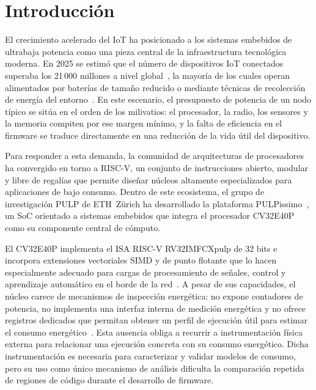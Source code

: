 \chapter{Introducción}
\label{ch:intro}


El crecimiento acelerado del IoT ha posicionado a los
sistemas embebidos de ultrabaja potencia como una pieza central de la
infraestructura tecnológica moderna. En 2025 se estimó que el número de
dispositivos IoT conectados superaba los
21\,000 millones a nivel global~\cite{iotanalytics2025},
la mayoría de los cuales operan alimentados por baterías de tamaño reducido
o mediante técnicas de recolección de energía del entorno~\cite{iotlowpowersurvey}. En este escenario,
el presupuesto de potencia de un nodo típico se sitúa en el orden de los
milivatios: el procesador, la radio, los sensores y la memoria compiten por
ese margen mínimo, y la falta de eficiencia en el firmware se traduce
directamente en una reducción de la vida útil del dispositivo.

Para responder a esta demanda, la comunidad de arquitecturas de procesadores ha
convergido en torno a RISC-V, un conjunto de instrucciones abierto, modular y
libre de regalías que permite diseñar núcleos altamente especializados para
aplicaciones de bajo consumo. Dentro de este ecosistema, el grupo de investigación PULP de ETH~Zürich ha desarrollado la plataforma PULPissimo~\cite{pulpissimo}, un
SoC orientado a sistemas embebidos que integra el procesador CV32E40P~\cite{cv32e40p} como su componente central de cómputo.

El CV32E40P implementa el ISA RISC-V RV32IMFCXpulp de 32 bits e incorpora
extensiones vectoriales SIMD y de punto flotante que lo hacen especialmente
adecuado para cargas de procesamiento de señales, control y aprendizaje
automático en el borde de la red~\cite{cv32e40p}. A pesar de sus capacidades, el núcleo carece de mecanismos de inspección energética: no expone contadores de potencia,
no implementa una interfaz interna de medición energética y no ofrece registros
dedicados que permitan obtener un perfil de ejecución útil para estimar el
consumo energético~\cite{leonvega2024efimon}.
Esta ausencia obliga a recurrir a instrumentación física externa para relacionar
una ejecución concreta con su consumo energético. Dicha instrumentación es
necesaria para caracterizar y validar modelos de consumo, pero su uso como único
mecanismo de análisis dificulta la comparación repetida de regiones de código
durante el desarrollo de firmware.

